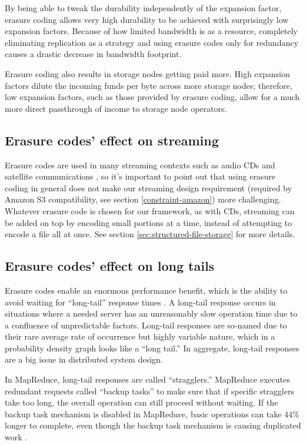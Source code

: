 \documentclass[8pt,fleqn,openany]{book}
\begin{document}
By being able to tweak the durability independently of the expansion factor,
erasure coding allows very high durability to be achieved with surprisingly
low expansion factors.
Because of how limited bandwidth is as a resource, completely eliminating
replication as a
strategy and using erasure codes only for redundancy causes a drastic
decrease in bandwidth footprint.

Erasure coding also results in storage nodes getting paid more.
High expansion factors dilute the incoming funds per byte across more storage
nodes; therefore, low expansion factors, such as those provided by erasure
coding, allow for a much more direct passthrough of income to storage node
operators.

\subsection{Erasure codes' effect on streaming}

Erasure codes are used in many streaming contexts such as audio CDs and
satellite communications \cite{rs-cd},
so it's important to point out that using erasure coding in general does not
make our streaming design requirement (required by Amazon S3 compatibility,
see section \ref{constraint-amazon}) more challenging.
Whatever erasure code is chosen for our framework, as with CDs, streaming can
be added on top by encoding small portions at a time, instead of attempting to
encode a file all at once. See section \ref{sec:structured-file-storage} for
more details.

\subsection{Erasure codes' effect on long tails}\label{sec:long-tail}

Erasure codes enable an enormous performance benefit, which is the ability to
avoid waiting for ``long-tail'' response times \cite{tail-at-scale}. A
long-tail response occurs in situations where a needed server has an
unreasonably slow operation time due to a confluence of unpredictable factors.
Long-tail responses are so-named due to their rare average rate of occurrence
but highly variable nature, which in a probability density graph looks like a
``long tail.''
In aggregate, long-tail responses are a big issue in distributed system design.

In MapReduce, long-tail responses are called ``stragglers.''
MapReduce executes redundant requests called ``backup tasks'' to make
sure that if specific stragglers take too long, the overall operation can still
proceed without waiting. If the backup task mechanism is disabled in MapReduce,
basic operations can take 44\% longer to complete, even though
the backup task mechanism is causing duplicated work \cite{mapreduce}.
\end{document}
